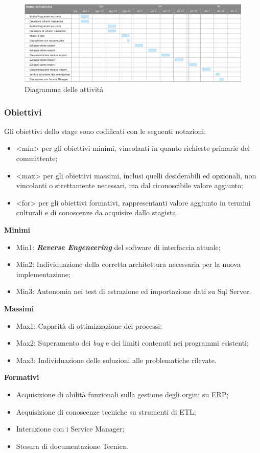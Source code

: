 \begin{figure}[!h]
\thispagestyle{empty}
\centering
\includegraphics[scale=0.85]{img/Gantt.png}
\caption{Diagramma delle attività}
\end{figure}
\newpage

\subsubsection{Obiettivi}
Gli obiettivi dello stage sono codificati con le seguenti notazioni:
\begin{itemize}
\item <min> per gli obiettivi minimi, vincolanti in quanto richieste primarie del committente;
\item <max> per gli obiettivi massimi, inclusi quelli desiderabili ed opzionali, non vincolanti o strettamente necessari, ma dal riconoscibile valore aggiunto;
\item <for> per gli obiettivi formativi, rappresentanti valore aggiunto in termini culturali e di conoscenze da acquisire dallo stagista.
\end{itemize}

\textbf{Minimi}
\begin{itemize}
\item Min1: \textit{\textbf{Reverse Engeneering}} del software di interfaccia attuale;
\item Min2: Individuazione della corretta architettura necessaria per la nuova implementazione;
\item Min3: Autonomia nei test di estrazione ed importazione dati su Sql Server.
\end{itemize}

\textbf{Massimi}
\begin{itemize}
\item Max1: Capacità di ottimizzazione dei processi;
\item Max2: Superamento dei \textit{bug} e dei limiti contenuti nei programmi esistenti;
\item Max3: Individuazione delle soluzioni alle problematiche rilevate.
\end{itemize}

\textbf{Formativi}
\begin{itemize}
\item Acquisizione di abilità funzionali sulla gestione degli orgini su ERP;
\item Acquisizione di conoscenze tecniche su strumenti di ETL;
\item Interazione con i Service Manager;
\item Stesura di documentazione Tecnica.
\end{itemize}